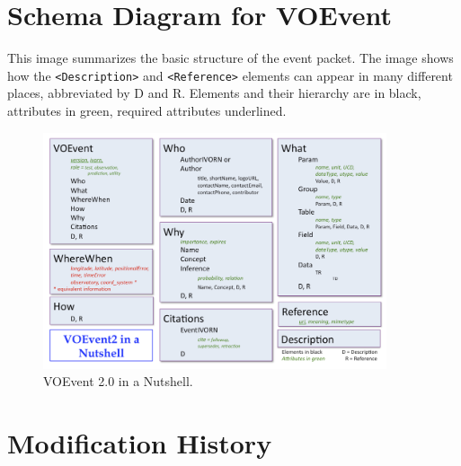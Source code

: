 \documentclass[11pt,a4paper]{ivoa}
\begin{document}
\section{Schema Diagram for VOEvent}
\label{sec:5}
This image summarizes the basic structure of the event packet. The image shows 
how the {\tt <Description>} and {\tt <Reference>} elements can appear in many 
different places, abbreviated by D and R. Elements and their hierarchy are in 
black, attributes in green, required attributes underlined.
\begin{figure}[th]
\begin{center}
\includegraphics[width=0.9\textwidth]{nutshell.png} \end{center}
\caption{VOEvent 2.0 in a Nutshell.}
\label{fig:nutshell}
\end{figure}





\appendix

\section{Modification History}
\end{document}
